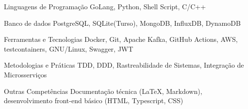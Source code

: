 
\begin{cvskills}
  \cvskill
  {Linguagens de Programação}
  {GoLang, Python, Shell Script, C/C++}

  \cvskill
  {Banco de dados}
  {PostgreSQL, SQLite(Turso), MongoDB, InfluxDB, DynamoDB}

  \cvskill
  {Ferramentas e Tecnologias}
  {Docker, Git, Apache Kafka, GitHub Actions, AWS, testcontainers, GNU/Linux, Swagger, JWT}

  \cvskill
  {Metodologias e Práticas}
  {TDD, DDD, Rastreabilidade de Sistemas, Integração de Microsserviços}

  \cvskill
  {Outras Competências}
  {Documentação técnica (LaTeX, Markdown), desenvolvimento front-end básico (HTML, Typescript, CSS)}
\end{cvskills}
